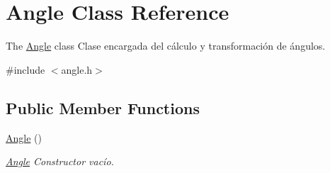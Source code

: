 \hypertarget{class_angle}{\section{Angle Class Reference}
\label{class_angle}
}


The \hyperlink{class_angle}{Angle} class Clase encargada del cálculo y transformación de ángulos.  




{\ttfamily \#include $<$angle.\+h$>$}

\subsection*{Public Member Functions}
\begin{DoxyCompactItemize}
\item 
\hypertarget{class_angle_aca3c6e1519b40835d31736430ca082a9}{\hyperlink{class_angle_aca3c6e1519b40835d31736430ca082a9}{Angle} ()}\label{class_angle_aca3c6e1519b40835d31736430ca082a9}

\begin{DoxyCompactList}\small\item\em \hyperlink{class_angle}{Angle} Constructor vacío. \end{DoxyCompactList}\end{DoxyCompactItemize}
